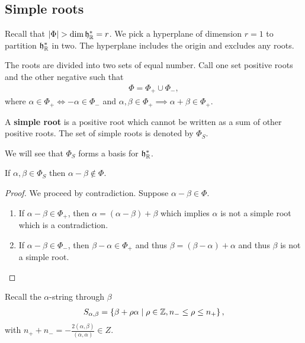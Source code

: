 \subsection{Simple roots}

Recall that $\left| \Phi \right| > \dim \mathfrak{h}^{*}_{\mathbb{R}} = r$. We pick a hyperplane of dimension $r = 1$ to partition $\mathfrak{h}_{\mathbb{R}}^{*}$ in two. The hyperplane includes the origin and excludes any roots. 

The roots are divided into two sets of equal number. Call one set positive roots and the other negative such that
\begin{align}
    \Phi = \Phi_+ \cup \Phi_-
,\end{align}
where $\alpha \in \Phi_+ \iff -\alpha \in \Phi_-$ and $\alpha , \beta \in \Phi_+ \implies \alpha + \beta \in \Phi_+$.

\begin{definition}
    A \textbf{simple root} is a positive root which cannot be written as a sum of other positive roots. The set of simple roots is denoted by $\Phi_S$.
\end{definition}

We will see that $\Phi_S$ forms a basis for $\mathfrak{h}^{*}_{\mathbb{R}}$.

\begin{claim}
    If $\alpha , \beta \in \Phi_S$ then $\alpha - \beta \notin \Phi$.
\end{claim}
\begin{proof}
    We proceed by contradiction. Suppose $\alpha - \beta \in \Phi$. 
    \begin{enumerate}[label=\alph*)]
        \item If $\alpha - \beta \in \Phi_+$, then $\alpha = \left( \alpha - \beta \right) + \beta$ which implies $\alpha$ is not a simple root which is a contradiction.
        \item If $\alpha -\beta \in \Phi_-$, then $\beta - \alpha \in \Phi_+$ and thus $\beta = \left( \beta - \alpha \right) + \alpha$ and thus $\beta$ is not a simple root.
    \end{enumerate}
\end{proof}

Recall the $\alpha$-string through $\beta$
\begin{align}
    S_{\alpha, \beta} = \left\{ \beta + \rho \alpha  \mid \rho \in \mathbb{Z}, n_- \leq \rho \leq n_+ \right\} 
,\end{align}
with $n_+ + n_- = - \frac{2 \left( \alpha, \beta \right) }{\left( \alpha, \alpha \right) } \in Z$.

